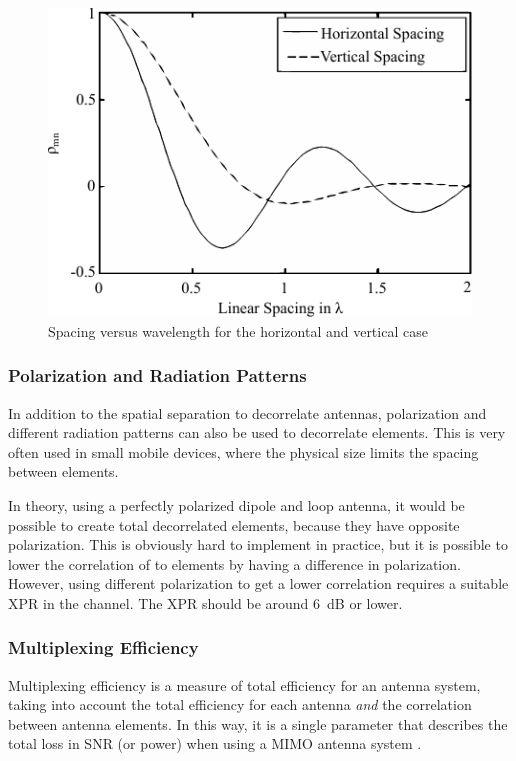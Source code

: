\begin{figure}[htbp]
  \centering
  \includegraphics[scale=1.2]{img/analysis/mimoSpacing}
  \caption{Spacing versus wavelength for the horizontal and vertical case\cite{Tim2012Practical}}
  \label{fig:mimo-spacing}
\end{figure}

\subsubsection{Polarization and Radiation Patterns}
In addition to the spatial separation to decorrelate antennas, polarization and different radiation patterns can also be used to decorrelate elements. This is very often used in small mobile devices, where the physical size limits the spacing between elements.  

In theory, using a perfectly polarized dipole and loop antenna, it would be possible to create total decorrelated elements, because they have opposite polarization. This is obviously hard to implement in practice, but it is possible to lower the correlation of to elements by having a difference in polarization. However, using different polarization to get a lower correlation requires a suitable XPR in the channel. The XPR should be around \SI{6}{dB} or lower\cite{Tim2012Practical}. 

\subsubsection{Multiplexing Efficiency}
\label{sec:muxefficiency}

Multiplexing efficiency is a measure of total efficiency for an antenna system, taking into account the total efficiency for each antenna \emph{and} the correlation between antenna elements. In this way, it is a single parameter that describes the total loss in SNR (or power) when using a MIMO antenna system \cite{tian2011multiplexing}.

